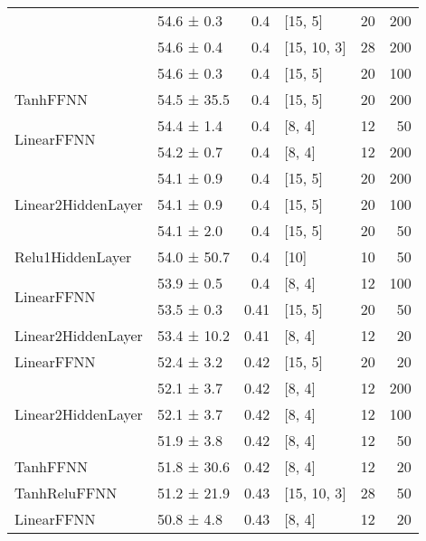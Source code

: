 \begin{longtable}{llrlrr}
         & 54.6 ± 0.3  &  0.4  & [15, 5]        &         20 &      200 \\
         & 54.6 ± 0.4  &  0.4  & [15, 10, 3]    &         28 &      200 \\
         & 54.6 ± 0.3  &  0.4  & [15, 5]        &         20 &      100 \\
 \hline
TanhFFNN         & 54.5 ± 35.5 &  0.4  & [15, 5]        &         20 &      200 \\
 \hline
\multirow{2}{*}{LinearFFNN}         & 54.4 ± 1.4  &  0.4  & [8, 4]         &         12 &       50 \\
         & 54.2 ± 0.7  &  0.4  & [8, 4]         &         12 &      200 \\
 \hline
\multirow{3}{*}{Linear2HiddenLayer}         & 54.1 ± 0.9  &  0.4  & [15, 5]        &         20 &      200 \\
         & 54.1 ± 0.9  &  0.4  & [15, 5]        &         20 &      100 \\
         & 54.1 ± 2.0  &  0.4  & [15, 5]        &         20 &       50 \\
 \hline
Relu1HiddenLayer         & 54.0 ± 50.7 &  0.4  & [10]           &         10 &       50 \\
 \hline
\multirow{2}{*}{LinearFFNN}         & 53.9 ± 0.5  &  0.4  & [8, 4]         &         12 &      100 \\
         & 53.5 ± 0.3  &  0.41 & [15, 5]        &         20 &       50 \\
 \hline
Linear2HiddenLayer         & 53.4 ± 10.2 &  0.41 & [8, 4]         &         12 &       20 \\
 \hline
LinearFFNN         & 52.4 ± 3.2  &  0.42 & [15, 5]        &         20 &       20 \\
 \hline
\multirow{3}{*}{Linear2HiddenLayer}         & 52.1 ± 3.7  &  0.42 & [8, 4]         &         12 &      200 \\
         & 52.1 ± 3.7  &  0.42 & [8, 4]         &         12 &      100 \\
         & 51.9 ± 3.8  &  0.42 & [8, 4]         &         12 &       50 \\
 \hline
TanhFFNN         & 51.8 ± 30.6 &  0.42 & [8, 4]         &         12 &       20 \\
 \hline
TanhReluFFNN         & 51.2 ± 21.9 &  0.43 & [15, 10, 3]    &         28 &       50 \\
 \hline
LinearFFNN         & 50.8 ± 4.8  &  0.43 & [8, 4]         &         12 &       20 \\
 \hline

\end{longtable}
